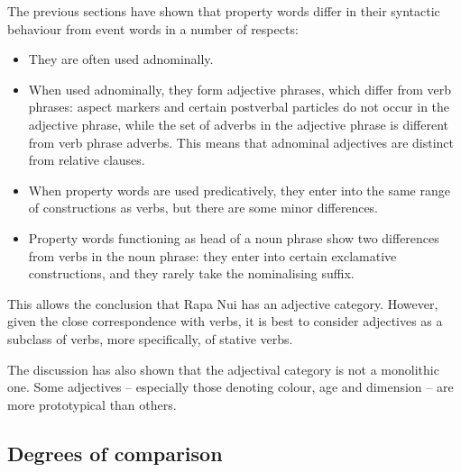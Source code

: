 The previous sections have shown that property words differ in their syntactic behaviour from event words in a number of respects:

\begin{itemize}
\item 
They are often used adnominally.

\item 
When used adnominally, they form adjective phrases, which differ from verb phrases: aspect markers and certain postverbal particles do not occur in the adjective phrase, while the set of adverbs in the adjective phrase is different from verb phrase adverbs. This means that adnominal adjectives are distinct from relative clauses.

\item 
When property words are used predicatively, they enter into the same range of constructions as verbs, but there are some minor differences.

\item 
Property words functioning as head of a noun phrase show two differences from verbs in the noun phrase: they enter into certain exclamative constructions, and they rarely take the nominalising suffix.

\end{itemize}

This allows the conclusion that Rapa Nui has an adjective category. However, given the close correspondence with verbs, it is best to consider adjectives as a subclass of verbs, more specifically, of stative verbs. 

The discussion has also shown that the adjectival category is not a monolithic one. Some adjectives – especially those denoting colour, age and dimension – are more prototypical than others. 

\subsection{Degrees of comparison}\label{sec:3.5.2}
